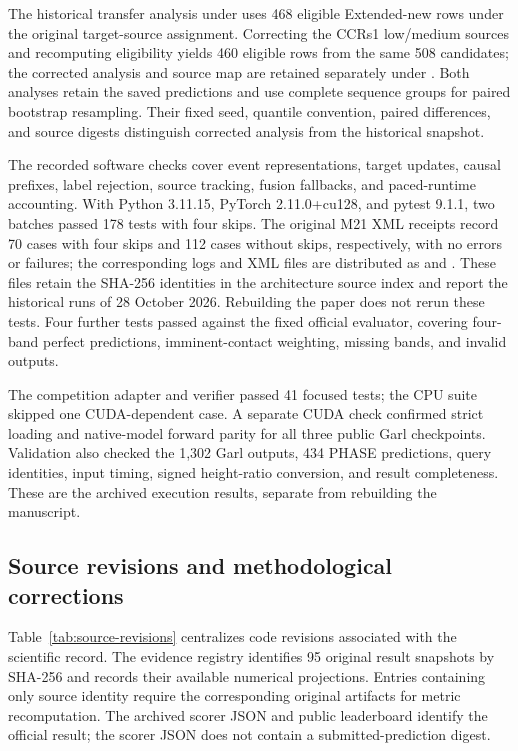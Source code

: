 

The historical transfer analysis under  uses 468 eligible Extended-new rows under the original target-source assignment. Correcting the CCRs1 low/medium sources and recomputing eligibility yields 460 eligible rows from the same 508 candidates; the corrected analysis and source map are retained separately under . Both analyses retain the saved predictions and use complete sequence groups for paired bootstrap resampling. Their fixed seed, quantile convention, paired differences, and source digests distinguish corrected analysis from the historical snapshot.

The recorded software checks cover event representations, target updates, causal prefixes, label rejection, source tracking, fusion fallbacks, and paced-runtime accounting. With Python 3.11.15, PyTorch 2.11.0+cu128, and pytest 9.1.1, two batches passed 178 tests with four skips. The original M21 XML receipts record 70 cases with four skips and 112 cases without skips, respectively, with no errors or failures; the corresponding logs and XML files are distributed as  and . These files retain the SHA-256 identities in the architecture source index and report the historical runs of 28 October 2026. Rebuilding the paper does not rerun these tests. Four further tests passed against the fixed official evaluator, covering four-band perfect predictions, imminent-contact weighting, missing bands, and invalid outputs. 

The competition adapter and verifier passed 41 focused tests; the CPU suite skipped one CUDA-dependent case. A separate CUDA check confirmed strict loading and native-model forward parity for all three public Garl checkpoints. Validation also checked the 1,302 Garl outputs, 434 PHASE predictions, query identities, input timing, signed height-ratio conversion, and result completeness. These are the archived execution results, separate from rebuilding the manuscript. 

\subsection{Source revisions and methodological corrections}
Table~\ref{tab:source-revisions} centralizes code revisions associated with the scientific record. The evidence registry identifies 95 original result snapshots by SHA-256 and records their available numerical projections. Entries containing only source identity require the corresponding original artifacts for metric recomputation. The archived scorer JSON and public leaderboard identify the official result; the scorer JSON does not contain a submitted-prediction digest.

